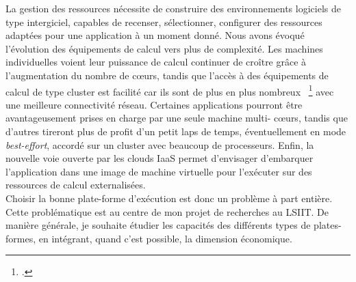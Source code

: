 \documentclass[11pt]{article}
\begin{document}
La gestion des ressources nécessite de construire des environnements logiciels 
de type intergiciel, capables de recenser, sélectionner, configurer des 
ressources adaptées pour une application à un moment donné. Nous avons évoqué 
l'évolution des équipements de calcul vers plus de complexité. Les machines 
individuelles voient leur puissance de calcul continuer de croître grâce à 
l'augmentation du nombre de c{\oe}urs, tandis que l'accès à des équipements 
de calcul de type cluster est facilité car ils sont de plus en plus nombreux~%
\footcite{Wu09} avec une  meilleure connectivité réseau.  Certaines applications 
pourront être avantageusement prises en charge par une seule machine multi-%
c{\oe}urs, tandis que d'autres tireront plus de profit d'un petit laps de temps,  
éventuellement en mode \textit{best-effort}, accordé sur un cluster avec beaucoup 
de processeurs. Enfin, la nouvelle voie ouverte par les clouds IaaS permet 
d'envisager d'embarquer l'application  dans une image de machine virtuelle 
pour l'exécuter sur des ressources de calcul externalisées. \\

Choisir la bonne plate-forme d'exécution est donc un problème à part entière.
Cette problématique est au centre de mon projet de recherches au LSIIT. De 
manière générale, je souhaite étudier les capacités des différents types de 
plates-formes, en intégrant, quand c'est possible, la dimension économique.
\end{document}
